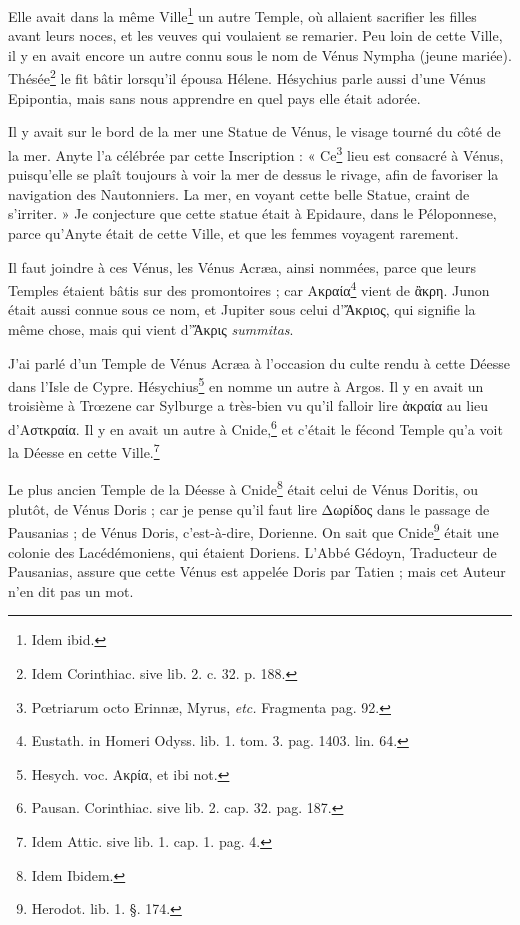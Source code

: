 \documentclass[a4paper, 18pt, oneside]{article}
\begin{document}
Elle avait dans la même Ville\footnote{Idem ibid.} un autre Temple, où allaient sacrifier les filles avant leurs noces, et les veuves qui voulaient se remarier. Peu loin de cette Ville, il y en avait encore un autre connu sous le nom de Vénus Nympha (jeune mariée). Thésée\footnote{Idem Corinthiac. sive lib. 2. c. 32. p. 188.} le fit bâtir lorsqu'il épousa Hélene. Hésychius parle aussi d'une Vénus Epipontia, mais sans nous apprendre en quel pays elle était adorée.

Il y avait sur le bord de la mer une Statue de Vénus, le visage tourné du côté de la mer. Anyte l'a célébrée par cette Inscription : « Ce\footnote{Pœtriarum octo Erinnæ, Myrus, \emph{etc.} Fragmenta pag. 92.} lieu est consacré à Vénus, puisqu'elle se plaît toujours à voir la mer de dessus le rivage, afin de favoriser la navigation des Nautonniers. La mer, en voyant cette belle Statue, craint de s'irriter. » Je conjecture que cette statue était à Epidaure, dans le Péloponnese, parce qu'Anyte était de cette Ville, et que les femmes voyagent rarement.

Il faut joindre à ces Vénus, les Vénus Acræa, ainsi nommées, parce que leurs Temples étaient bâtis sur des promontoires ; car Ακραία\footnote{Eustath. in Homeri Odyss. lib. 1. tom. 3. pag. 1403. lin. 64.} vient de ἂκρη. Junon était aussi connue sous ce nom, et Jupiter sous celui d'Ἄκριος, qui signifie la même chose, mais qui vient d'Ἄκρις \emph{summitas}.

J'ai parlé d'un Temple de Vénus Acræa à l'occasion du culte rendu à cette Déesse dans l'Isle de Cypre. Hésychius\footnote{Hesych. voc. Ακρία, et ibi not.} en nomme un autre à Argos. Il y en avait un troisième à Trœzene car Sylburge a très-bien vu qu'il falloir lire ἀκραία au lieu d'Αστκραία. Il y en avait un autre à Cnide,\footnote{Pausan. Corinthiac. sive lib. 2. cap. 32. pag. 187.} et c'était le fécond Temple qu'a voit la Déesse en cette Ville.\footnote{Idem Attic. sive lib. 1. cap. 1. pag. 4.}

Le plus ancien Temple de la Déesse à Cnide\footnote{Idem Ibidem.} était celui de Vénus Doritis, ou plutôt, de Vénus Doris ; car je pense qu'il faut lire Δωρίδος dans le passage de Pausanias ; de Vénus Doris, c'est-à-dire, Dorienne. On sait que Cnide\footnote{Herodot. lib. 1. §. 174.} était une colonie des Lacédémoniens, qui étaient Doriens. L'Abbé Gédoyn, Traducteur de Pausanias, assure que cette Vénus est appelée Doris par Tatien ; mais cet Auteur n'en dit pas un mot.
\end{document}
